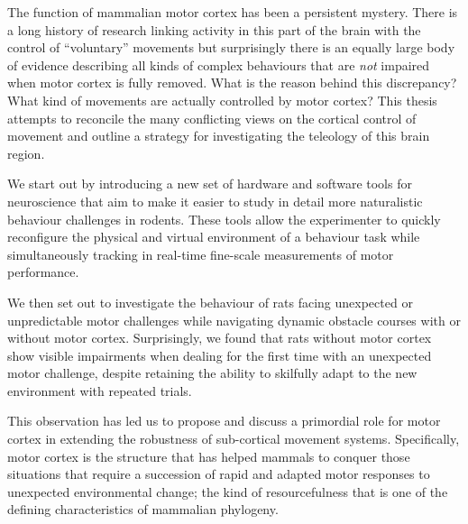 \label{ch:abstract}

The function of mammalian motor cortex has been a persistent mystery. There is a long history of research linking activity in this part of the brain with the control of ``voluntary'' movements but surprisingly there is an equally large body of evidence describing all kinds of complex behaviours that are \emph{not} impaired when motor cortex is fully removed. What is the reason behind this discrepancy? What kind of movements are actually controlled by motor cortex? This thesis attempts to reconcile the many conflicting views on the cortical control of movement and outline a strategy for investigating the teleology of this brain region.

We start out by introducing a new set of hardware and software tools for neuroscience that aim to make it easier to study in detail more naturalistic behaviour challenges in rodents. These tools allow the experimenter to quickly reconfigure the physical and virtual environment of a behaviour task while simultaneously tracking in real-time fine-scale measurements of motor performance.

We then set out to investigate the behaviour of rats facing unexpected or unpredictable motor challenges while navigating dynamic obstacle courses with or without motor cortex. Surprisingly, we found that rats without motor cortex show visible impairments when dealing for the first time with an unexpected motor challenge, despite retaining the ability to skilfully adapt to the new environment with repeated trials.

This observation has led us to propose and discuss a primordial role for motor cortex in extending the robustness of sub-cortical movement systems. Specifically, motor cortex is the structure that has helped mammals to conquer those situations that require a succession of rapid and adapted motor responses to unexpected environmental change; the kind of resourcefulness that is one of the defining characteristics of mammalian phylogeny.
